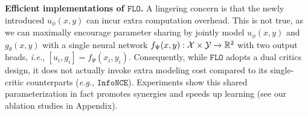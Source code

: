 \documentclass{article}
\theoremstyle{plain}
\theoremstyle{definition}
\theoremstyle{remark}
\newcommand{\infonce}{\texttt{InfoNCE}}
\newcommand{\FLO}{\texttt{FLO}}
\newcommand{\PMI}{\text{PMI}}
\begin{document}
		
		{\bf Efficient implementations of $\FLO$.} A lingering concern is that the newly introduced $u_{\phi}(x,y)$ can incur extra computation overhead. This is not true, as we can maximally encourage parameter sharing by jointly model $u_{\phi}(x,y)$ and $g_{\theta}(x,y)$ with a single neural network $f_{\Psi}(x,y):\mathcal{X} \times \mathcal{Y} \rightarrow \mathbb{R}^2$ with two output heads, {\it i.e.}, $[u_i, g_i] = f_{\Psi}(x_i, y_i)$. Consequently, while $\FLO$ adopts a dual critics design, it does not actually invoke extra modeling cost compared to its single-critic counterparts ({\it e.g.}, $\infonce$). Experiments show this shared parameterization in fact promotes synergies and speeds up learning (see our ablation studies in Appendix). 
		
\end{document}
